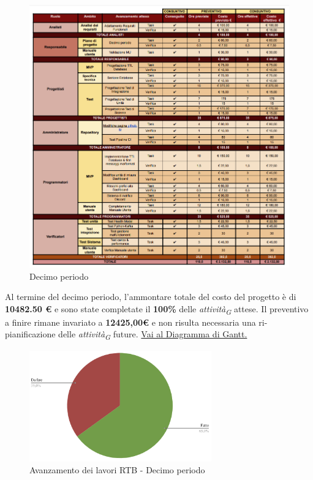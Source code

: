 \begin{figure}[H]
    \centering
    \includegraphics[height=1.1\textwidth]{../Images/tabG10.PNG}
    \caption{Decimo periodo}
    \label{fig:Decimo_periodo}
\end{figure}

Al termine del decimo periodo, l'ammontare totale del costo del progetto è di \textbf{10482.50 \euro} e sono state completate il \textbf{100\%} delle \textit{attività}\textsubscript{\textit{G}} attese.
Il preventivo a finire rimane invariato a \textbf{12425,00\euro} e non risulta necessaria una ri-pianificazione delle \textit{attività}\textsubscript{\textit{G}} future.
\href{https://github.com/orgs/ByteOps-swe/projects/3/views/1?sortedBy%5Bdirection%5D=asc&sortedBy%5BcolumnId%5D=64182560}{Vai al Diagramma di Gantt.}

\begin{figure}[H]
    \centering
    \begin{minipage}[b]{0.70\textwidth}
        \centering
        \includegraphics[width=0.7\textwidth]{../Images/torta10.png}
        \caption{Avanzamento dei lavori RTB - Decimo periodo}
        \label{fig:Avanzamento_RTB_10}
    \end{minipage}
\end{figure}

